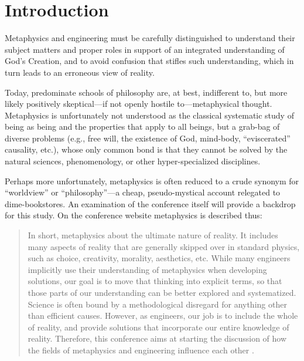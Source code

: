 \section{Introduction}



Metaphysics and engineering must be carefully distinguished to understand their subject matters and proper roles in support of an integrated understanding of God's Creation, and to avoid confusion that stifles such understanding, which in turn leads to an erroneous view of reality.

Today, predominate schools of philosophy are, at best, indifferent to, but more likely positively skeptical---if not openly hostile to---metaphysical thought. Metaphysics is unfortunately not understood as the classical systematic study of being as being and the properties that apply to all beings, but a grab-bag of diverse problems (e.g., free will, the existence of God, mind-body, ``eviscerated'' causality, etc.), whose only common bond is that they cannot be solved by the natural sciences, phenomenology, or other hyper-specialized disciplines.

Perhaps more unfortunately, metaphysics is often reduced to a crude synonym for ``worldview'' or ``philosophy''---a cheap, pseudo-mystical account relegated to dime-bookstores. An examination of the conference itself will provide a backdrop for this study.  On the conference website metaphysics is described thus:

\begin{quote}
In short, metaphysics  about the ultimate nature of reality. It includes many aspects of reality that are generally skipped over in standard physics, such as choice, creativity, morality, aesthetics, etc. While many engineers implicitly use their understanding of metaphysics when developing solutions, our goal is to move that thinking into explicit terms, so that those parts of our understanding can be better explored and systematized. Science is often bound by a methodological disregard for anything other than efficient causes. However, as engineers, our job is to include the whole of reality, and provide solutions that incorporate our entire knowledge of reality. Therefore, this conference aims at starting the discussion of how the fields of metaphysics and engineering influence each other \citep{aboutconference}.
\end{quote}

